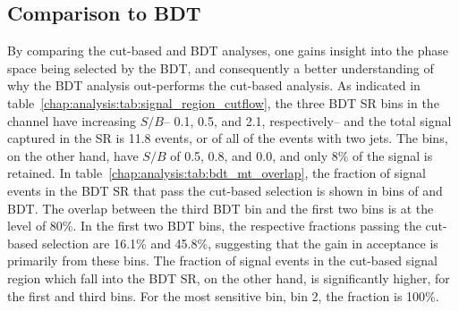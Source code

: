 \begin{table}[h]
\centering
\caption{Fraction of signal events in \emme events in BDT SR that also pass
  the cut-based selection split into BDT and \mT bins (e.g., 5.7\% of
  the signal falling in BDT bin 1 falls into \mT bin 2). ``All'' indicates
  the fraction when integrated over all \mT bins.}
\label{chap:analysis:tab:bdt_mt_overlap}
\end{table}

\subsection{Comparison to BDT}

By comparing the cut-based and BDT analyses, one gains insight into
the phase space being selected by the BDT, and consequently a better
understanding of why the BDT analysis out-performs the cut-based
analysis. As indicated in
table~\ref{chap:analysis:tab:signal_region_cutflow}, the three BDT
SR bins in the \emme channel have increasing $S/B$-- 0.1, 0.5, and
2.1, respectively-- and the total signal captured in the SR is 11.8
events, or  of all of the \emme events with two jets.
The \mT bins, on the other hand, have $S/B$ of 0.5,
0.8, and 0.0, and only 8\% of the signal is retained. In
table~\ref{chap:analysis:tab:bdt_mt_overlap}, the fraction of signal
events in the BDT SR that pass the cut-based selection is shown in bins of \mT and
BDT. The overlap between the third BDT bin and the
first two \mT bins is at the level of 80\%. In the first two BDT bins,
the respective fractions passing the cut-based selection are 16.1\%
and 45.8\%, suggesting that the gain in acceptance is primarily from
these bins. The fraction of signal events in the
cut-based signal region which fall into the BDT SR, on the other hand,
is significantly higher,  for the first and third \mT
bins. For the most sensitive \mT bin, bin 2, the fraction is 100\%. 

